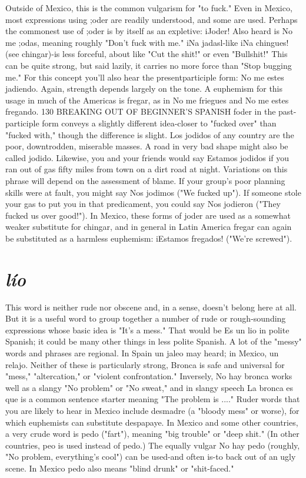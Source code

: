 Outside of Mexico, this is the common vulgarism for "to
fuck." Even in Mexico, most expressions using ;oder are readily understood, and some are used. Perhaps the commonest use of ;oder is by
itself as an expletive: iJoder! Also heard is No me ;odas, meaning
roughly "Don't fuck with me." iNa jadasl-like iNa chingues! (see
chingar)-is less forceful, about like "Cut the shit!" or even "Bullshit!" This can be quite strong, but said lazily, it carries no more force
than "Stop bugging me." For this concept you'll also hear the presentparticiple form: No me estes jadiendo. Again, strength depends largely
on the tone. A euphemism for this usage in much of the Americas is
fregar, as in No me friegues and No me estes fregando.
130 BREAKING OUT OF BEGINNER'S SPANISH
foder in the past-participle form conveys a slightly different
idea-closer to "fucked over" than "fucked with," though the difference is slight. Los jodidos of any country are the poor, downtrodden,
miserable masses. A road in very bad shape might also be called jodido. Likewise, you and your friends would say Estamos jodidos if you
ran out of gas fifty miles from town on a dirt road at night. Variations
on this phrase will depend on the assessment of blame. If your group's
poor planning skills were at fault, you might say Nos jodimos ("We
fucked up"). If someone stole your gas to put you in that predicament,
you could say Nos jodieron ("They fucked us over good!"). In Mexico,
these forms of joder are used as a somewhat weaker substitute for
chingar, and in general in Latin America fregar can again be substituted as a harmless euphemism: iEstamos fregados! ("We're screwed").

\section{\emph{lío}}

This word is neither rude nor obscene and, in a sense, doesn't
belong here at all. But it is a useful word to group together a number of
rude or rough-sounding expressions whose basic idea is "It's a mess."
That would be Es un lio in polite Spanish; it could be many other
things in less polite Spanish.
A lot of the "messy" words and phrases are regional. In Spain
un jaleo may heard; in Mexico, un relajo. Neither of these is particularly strong, Bronca is safe and universal for "mess," "altercation,"
or "violent confrontation." Inversely, No hay bronca works well as a
slangy "No problem" or "No sweat," and in slangy speech La bronca
es que is a common sentence starter meaning "The problem is ...."
Ruder words that you are likely to hear in Mexico include desmadre (a "bloody mess" or worse), for which euphemists can substitute despapaye. In Mexico and some other countries, a very crude
word is pedo ("fart"), meaning "big trouble" or "deep shit." (In other
countries, peo is used instead of pedo.) The equally vulgar No hay
pedo (roughly, "No problem, everything's cool") can be used-and
often is-to back out of an ugly scene. In Mexico pedo also means
"blind drunk" or "shit-faced."


